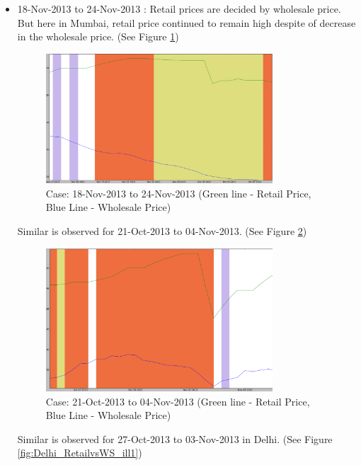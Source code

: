 \begin{itemize}
\item 18-Nov-2013 to 24-Nov-2013 : Retail prices are decided by wholesale price. But here in Mumbai, retail price continued to remain high despite of decrease in the wholesale price. (See Figure \ref{fig:Mumbai_RetailvsWS_ill1})

	\begin{figure}[H]
	\centering
	\includegraphics[width=0.8\textwidth]{graphs/Mumbai_RetailvsWS_ill1.png}
	\caption{Case: 18-Nov-2013 to 24-Nov-2013 (Green line - Retail Price, Blue Line - Wholesale Price)}
	\label{fig:Mumbai_RetailvsWS_ill1}
	\end{figure}	
Similar is observed for 21-Oct-2013 to 04-Nov-2013. (See Figure \ref{fig:Mumbai_RetailvsWS_ill2})

	\begin{figure}[H]
	\centering
	\includegraphics[width=0.8\textwidth]{graphs/Mumbai_RetailvsWS_ill2.png}
	\caption{Case: 21-Oct-2013 to 04-Nov-2013 (Green line - Retail Price, Blue Line - Wholesale Price)}
	\label{fig:Mumbai_RetailvsWS_ill2}
	\end{figure}

Similar is observed for 27-Oct-2013 to 03-Nov-2013 in Delhi. (See Figure \ref{fig:Delhi_RetailvsWS_ill1})


\end{itemize}
